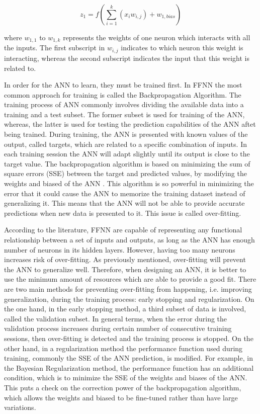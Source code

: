 \begin{equation}
    z_1 = f \left( \sum_{i=1}^k(x_i w_{i,j}) + w_{1,bias} \right)
\label{c6_neuronout}
\end{equation}

\noindent where $w_{1,1}$ to $w_{1,k}$ represents the weights of one neuron which interacts with all the inputs. The first subscript in $w_{i,j}$ indicates to which neuron this weight is interacting, whereas the second subscript indicates the input that this weight is related to.

In order for the ANN to learn, they must be trained first. In FFNN the most common approach for training is called the Backpropagation Algorithm. The training process of ANN commonly involves dividing the available data into a training and a test subset. The former subset is used for training of the ANN, whereas, the latter is used for testing the prediction capabilities of the ANN aftet being trained. During training, the ANN is presented with known values of the output, called targets, which are related to a specific combination of inputs. In each training session the ANN will adapt slightly until its output is close to the target value. The backpropagation algorithm is based on minimizing the sum of square errors (SSE) between the target and predicted values, by modifying the weights and biased of the ANN \cite{zhang2003artificial}. This algorithm is so powerful in minimizing the error that it could cause the ANN to memorize the training dataset instead of generalizing it. This means that the ANN will not be able to provide accurate predictions when new data is presented to it. This issue is called over-fitting.

According to the literature, FFNN are capable of representing any functional relationship between a set of inputs and outputs, as long as the ANN has enough number of neurons in its hidden layers. However, having too many neurons increases risk of over-fitting. As previously mentioned, over-fitting will prevent the ANN to generalize well. Therefore, when designing an ANN, it is better to use the minimum amount of resources which are able to provide a good fit. There are two main methods for preventing over-fitting from happening, i.e. improving generalization, during the training process: early stopping and regularization. On the one hand, in the early stopping method, a third subset of data is involved, called the validation subset. In general terms, when the error during the validation process increases during certain number of consecutive training sessions, then over-fitting is detected and the training process is stopped. On the other hand, in a regularization method the performance function used during training, commonly the SSE of the ANN prediction, is modified. For example, in the Bayesian Regularization method, the performance function has an additional condition, which is to minimize the SSE of the weights and biases of the ANN. This puts a check on the correction power of the backpropagation algorithm, which allows the weights and biased to be fine-tuned rather than have large variations. 

